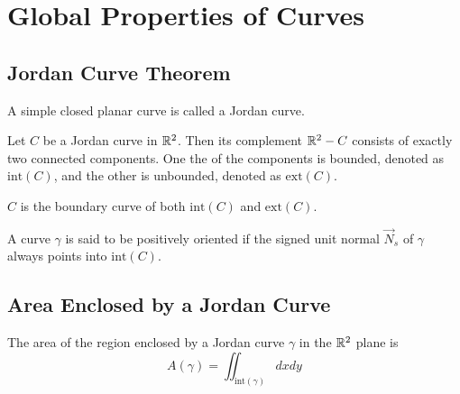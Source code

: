 \documentclass[11pt]{penrose}
\newcommand{\vN}{\vec{N}}
\renewcommand{\interior}[1]{\mathrm{int}(#1)}
\newcommand{\exterior}[1]{\mathrm{ext}(#1)}
\newcommand{\keyword}[1]{\textsf{#1}}
\begin{document}
\section{Global Properties of Curves}
\subsection{Jordan Curve Theorem}

\begin{ndfn}
    A simple closed planar curve is called a \keyword{Jordan curve}.
\end{ndfn}

\begin{nthm}
    Let $C$ be a Jordan curve in $\mathbb{R}^2$. Then its complement $\mathbb{R}^2 - C$ consists of exactly two connected components. One the of the components is bounded, denoted as $\interior{C}$, and the other is unbounded, denoted as $\exterior{C}$.
\end{nthm}

$C$ is the boundary curve of both $\interior{C}$ and $\exterior{C}$.

\begin{ndfn}
    A curve $\gamma$ is said to be positively oriented if the signed unit normal $\vN_s$ of $\gamma$ always points into $\interior{C}$.
\end{ndfn}

\subsection{Area Enclosed by a Jordan Curve}
The area of the region enclosed by a Jordan curve $\gamma$ in the $\mathbb{R}^2$ plane is
\begin{equation}
    A(\gamma) = \iint_{\interior{\gamma}} dxdy
\end{equation}
\end{document}
